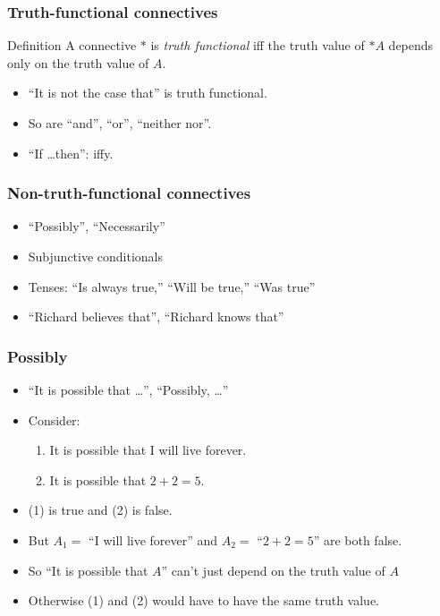 \begin{frame}
\frametitle{Truth-functional connectives}

\begin{block}{Definition}
  A connective $*$ is \emph{truth functional} iff the truth value of $*A$ depends only on the truth value of $A$.
\end{block}

\begin{itemize}[<+->]
  \item ``It is not the case that'' is truth functional.
  \item So are ``and'', ``or'', ``neither nor''.
  \item ``If \dots then'': iffy.
\end{itemize}

\end{frame}


\begin{frame}
  \frametitle{Non-truth-functional connectives}
  
  \begin{itemize}[<+->]
    \item ``Possibly'', ``Necessarily''
    \item Subjunctive conditionals
    \item Tenses: ``Is always true,'' ``Will be true,'' ``Was true''
    \item ``Richard believes that'', ``Richard knows that''
  \end{itemize}
  \end{frame}
  
\begin{frame}
\frametitle{Possibly}

  \begin{itemize}[<+->]
    \item ``It is possible that \dots'', ``Possibly, \dots''
    \item Consider:
      \begin{enumerate}[<+->]
        \item It is possible that I will live forever.
        \item It is possible that $2+2=5$.
      \end{enumerate}
    \item (1) is true and (2) is false.
    \item But $A_1=$ ``I will live forever'' and
    $A_2=$ ``$2+2=5$'' are both false.
    \item So ``It is possible that $A$'' can't just depend on the
    truth value of $A$
    \item Otherwise (1) and (2) would have to have the same truth value.
  \end{itemize}

\end{frame}

